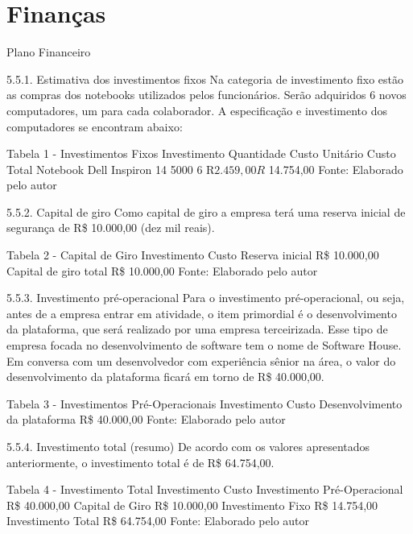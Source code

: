 \chapter{Finanças}
\label{chapter: Finanças}


\begin{commentA}

\par \end{commentA}

Plano Financeiro 

5.5.1. Estimativa dos investimentos fixos 
Na categoria de investimento fixo estão as compras dos notebooks utilizados pelos funcionários. Serão adquiridos 6 novos computadores, um para cada colaborador. A especificação e investimento dos computadores se encontram abaixo: 

Tabela 1 - Investimentos Fixos 
Investimento	Quantidade	Custo Unitário	Custo Total
Notebook Dell Inspiron 14 5000	6	R$    2 .459,00	R$  14.754,00
Fonte: Elaborado pelo autor 

5.5.2. Capital de giro 
Como capital de giro a empresa terá uma reserva inicial de segurança de R\$ 
10.000,00 (dez mil reais).\par


Tabela 2 - Capital de Giro 
Investimento	Custo
Reserva inicial	R\$  10.000,00
Capital de giro total	R\$  10.000,00
Fonte: Elaborado pelo autor \par


5.5.3. Investimento pré-operacional 
Para o investimento pré-operacional, ou seja, antes de a empresa entrar em atividade, o item primordial é o desenvolvimento da plataforma, que será realizado por uma empresa terceirizada. Esse tipo de empresa focada no desenvolvimento de software tem o nome de Software House. Em conversa com um desenvolvedor com experiência sênior na área, o valor do desenvolvimento da plataforma ficará em torno de R\$ 40.000,00.\par




Tabela 3 - Investimentos Pré-Operacionais 
Investimento	Custo
Desenvolvimento da plataforma	R\$  40.000,00
Fonte: Elaborado pelo autor \par



5.5.4. Investimento total (resumo) 
De acordo com os valores apresentados anteriormente, o investimento total é de R\$ 64.754,00. \par


Tabela 4 - Investimento Total 
Investimento	Custo
Investimento Pré-Operacional	R\$  40.000,00
Capital de Giro	R\$  10.000,00
Investimento Fixo	R\$  14.754,00
Investimento Total	R\$  64.754,00
Fonte: Elaborado pelo autor \par


